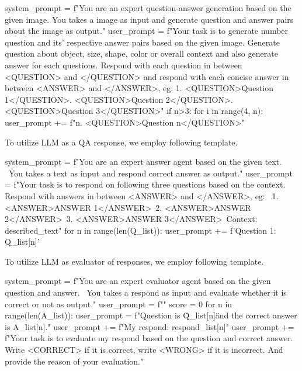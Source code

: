 \begin{python}  
system_prompt = f"You are an expert question-answer generation based on the given image. 
    You takes a image as input and generate question and answer pairs about the image as output."
user_prompt = f"Your task is to generate {number} question and its' respective answer pairs based on the given image. Generate question about object, size, shape, color or overall context and also generate answer for each questions. 
    Respond with each question in between <QUESTION> and </QUESTION> and respond with each concise answer in between <ANSWER> and </ANSWER>, eg: 
    1. <QUESTION>Question 1</QUESTION>. <QUESTION>Question 2</QUESTION>. <QUESTION>Question 3</QUESTION>\n"
    if n>3:
        for i in range(4, n):
            user_prompt += f"{n}. <QUESTION>Question {n}</QUESTION>\n"
\end{python}
To utilize LLM as a QA response, we employ following template.
\begin{python}
system_prompt = f"You are an expert answer agent based on the given text. \
    You takes a text as input and respond correct answer as output."
user_prompt = f"Your task is to respond on following three questions based on the context. Respond with answers in between <ANSWER> and </ANSWER>, eg: \
    1. <ANSWER>ANSWER 1</ANSWER>\n \
    2. <ANSWER>ANSWER 2</ANSWER>\n \
    3. <ANSWER>ANSWER 3</ANSWER>\n \
    Context: {described_text}\n"
    for n in range(len(Q_list)):
        user_prompt += f'Question 1: {Q_list[n]}\n'
\end{python}
To utilize LLM as evaluator of responses, we employ following template.
\begin{python}
system_prompt = f"You are an expert evaluator agent based on the given question and answer. \
    You takes a respond as input and evaluate whether it is correct or not as output."
user_prompt = f""
score = 0
for n in range(len(A_list)):
    user_prompt = f"Question is \"{Q_list[n]}\" and the correct answer is {A_list[n]}.\n"
    user_prompt += f"My respond: {respond_list[n]}\n"
    user_prompt += f"Your task is to evaluate my respond based on the question and correct answer. Write <CORRECT> if it is correct, write <WRONG> if it is incorrect. And provide the reason of your evaluation.\n"
\end{python}